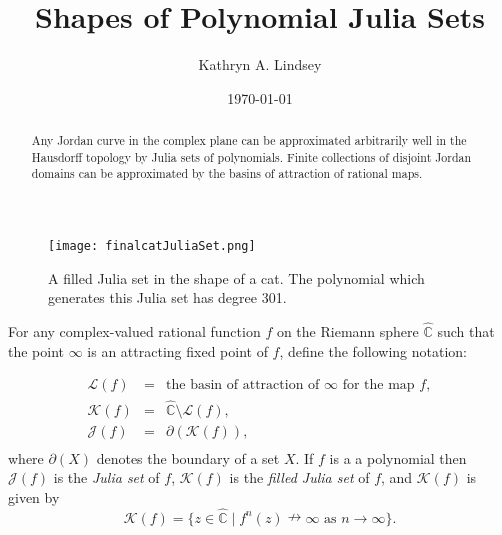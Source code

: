 \documentclass[a4paper,11pt,onecolumn]{amsart}
\theoremstyle{definition}
\begin{document}
 

\title{Shapes of Polynomial Julia Sets}

\author[Kathryn A. Lindsey]{Kathryn A. Lindsey}
\address[Kathryn Lindsey]{ Department of Mathematics, Cornell University\\ Ithaca, NY 14853, USA}

\subjclass{}
\keywords{}

\date{\today}
\maketitle 

\begin{abstract}
Any Jordan curve in the complex plane can be approximated arbitrarily well in the Hausdorff topology by Julia sets of polynomials.   Finite collections of disjoint Jordan domains can be approximated by the basins of attraction of rational maps.  \end{abstract}

  \begin{figure}[!h] 
  \centering
  \texttt{[image: finalcatJuliaSet.png]}
  \caption[]{A filled Julia set in the shape of a cat.  The polynomial which generates this Julia set has degree 301.
  }
  \end{figure}
  
  For any complex-valued rational function $f$ on the Riemann sphere $\hat{\mathbb{C}}$ such that the point $\infty$ is an attracting fixed point of $f$, define the following notation:
  
  $$\begin{array}{lcl}
\mathcal{L}(f) &=& \textrm{the basin of attraction of }   \infty \textrm{ for the map } f,  \\
\mathcal{K}(f) &=& \hat{\mathbb{C}} \setminus \mathcal{L}(f), \\
\mathcal{J}(f) &=& \partial(\mathcal{K}(f)), \\
 \end{array}$$
 where $\partial(X)$ denotes the boundary of a set $X$.  If $f$ is a a polynomial then $\mathcal{J}(f)$ is the \emph{Julia set} of $f$, $\mathcal{K}(f)$ is the \emph{filled Julia set} of $f$, and $\mathcal{K}(f)$ is given by $$\mathcal{K}(f) = \{z \in \hat{\mathbb{C}} \mid f^n(z) \nrightarrow \infty \textrm{ as } n \rightarrow \infty\}.$$
 
\end{document}
